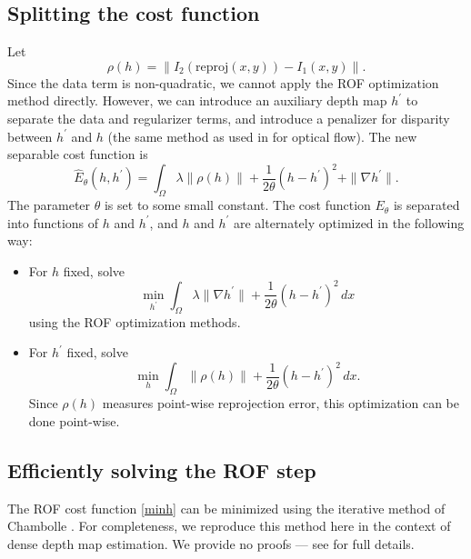 \documentclass[conference]{IEEEtran}
\begin{document}
\subsection{Splitting the cost function}
Let 
$$\rho(h) = \left\|I_2(\text{reproj}(x,y)) - I_1(x,y)\right\|.$$
Since the data term is non-quadratic, we
cannot apply the ROF optimization method directly. However, we can introduce
an auxiliary depth map $h^\prime$ to separate the data and regularizer terms,
and introduce a penalizer for disparity between $h^\prime$ and $h$ (the same method as used in \cite{tv_optical_flow} for optical flow). The
new separable cost function is
\begin{equation}\label{separable_cost}
    \hat{E}_\theta(h, h^\prime) = \int_\Omega \lambda \|\rho(h)\| + \frac{1}{2\theta}(h - h^\prime)^2 + \|\nabla h^\prime\|.
\end{equation}
The parameter $\theta$ is set to some small constant.
The cost function $E_\theta$ is separated into functions of $h$ and $h^\prime$,
and $h$ and $h^\prime$ are alternately optimized in the following way:
\begin{itemize}
    \item For $h$ fixed, solve
        \begin{equation}\label{minh}
            \min_{h^\prime} \int_\Omega \lambda \|\nabla h^\prime\| + \frac{1}{2\theta}(h - h^\prime)^2\,dx
        \end{equation}
    using the ROF optimization methods.
    \item For $h^\prime$ fixed, solve
        \begin{equation}\label{minhhat}
            \min_h \int_\Omega \|\rho(h)\| + \frac{1}{2\theta}(h - h^\prime)^2\,dx.
        \end{equation}
        Since $\rho(h)$ measures point-wise reprojection error, this
        optimization can be done point-wise.
\end{itemize}

\subsection{Efficiently solving the ROF step}
The ROF cost function \eqref{minh} can be minimized using the iterative method of Chambolle \cite{chambolle}. For completeness, we reproduce this
method here in the context of dense depth map estimation. We provide no proofs --- see \cite{chambolle} for full details.
\end{document}
